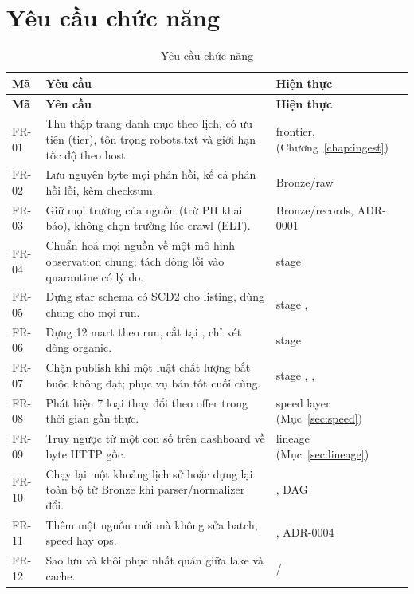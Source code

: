 \section{Yêu cầu chức năng}
\begin{xltabular}{\linewidth}{@{}L{12mm}Y L{44mm}@{}}
  \caption{Yêu cầu chức năng}\label{tab:fr}\\
  \toprule
  \textbf{Mã} & \textbf{Yêu cầu} & \textbf{Hiện thực} \\
  \midrule
  \endfirsthead
  \toprule \textbf{Mã} & \textbf{Yêu cầu} & \textbf{Hiện thực} \\ \midrule
  \endhead
  FR-01 & Thu thập trang danh mục theo lịch, có ưu tiên (tier), tôn trọng robots.txt và giới hạn tốc độ theo host. & frontier,  (Chương~\ref{chap:ingest}) \\
  FR-02 & Lưu nguyên byte mọi phản hồi, kể cả phản hồi lỗi, kèm checksum. & Bronze/raw \\
  FR-03 & Giữ mọi trường của nguồn (trừ PII khai báo), không chọn trường lúc crawl (ELT). & Bronze/records, ADR-0001 \\
  FR-04 & Chuẩn hoá mọi nguồn về một mô hình observation chung; tách dòng lỗi vào quarantine có lý do. & stage  \\
  FR-05 & Dựng star schema có SCD2 cho listing, dùng chung cho mọi run. & stage ,  \\
  FR-06 & Dựng 12 mart theo run, cắt tại , chỉ xét dòng organic. & stage  \\
  FR-07 & Chặn publish khi một luật chất lượng bắt buộc không đạt; phục vụ bản tốt cuối cùng. & stage , ,  \\
  FR-08 & Phát hiện 7 loại thay đổi theo offer trong thời gian gần thực. & speed layer (Mục~\ref{sec:speed}) \\
  FR-09 & Truy ngược từ một con số trên dashboard về byte HTTP gốc. & lineage (Mục~\ref{sec:lineage}) \\
  FR-10 & Chạy lại một khoảng lịch sử hoặc dựng lại toàn bộ từ Bronze khi parser/normalizer đổi. & , DAG  \\
  FR-11 & Thêm một nguồn mới mà không sửa batch, speed hay ops. & , ADR-0004 \\
  FR-12 & Sao lưu và khôi phục nhất quán giữa lake và cache. & / \\
  \bottomrule
\end{xltabular}

